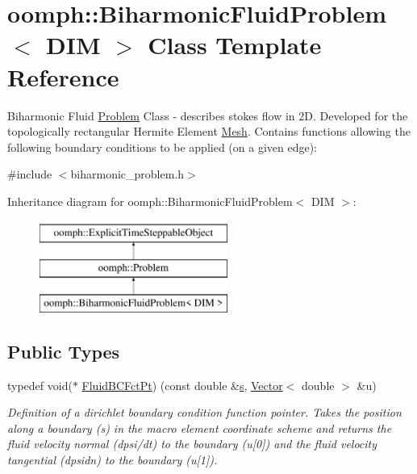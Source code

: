 \hypertarget{classoomph_1_1BiharmonicFluidProblem}{}\section{oomph\+:\+:Biharmonic\+Fluid\+Problem$<$ D\+IM $>$ Class Template Reference}
\label{classoomph_1_1BiharmonicFluidProblem}


Biharmonic Fluid \hyperlink{classoomph_1_1Problem}{Problem} Class -\/ describes stokes flow in 2D. Developed for the topologically rectangular Hermite Element \hyperlink{classoomph_1_1Mesh}{Mesh}. Contains functions allowing the following boundary conditions to be applied (on a given edge)\+:  




{\ttfamily \#include $<$biharmonic\+\_\+problem.\+h$>$}

Inheritance diagram for oomph\+:\+:Biharmonic\+Fluid\+Problem$<$ D\+IM $>$\+:\begin{figure}[H]
\begin{center}
\leavevmode
\includegraphics[height=3.000000cm]{classoomph_1_1BiharmonicFluidProblem}
\end{center}
\end{figure}
\subsection*{Public Types}
\begin{DoxyCompactItemize}
\item 
typedef void($\ast$ \hyperlink{classoomph_1_1BiharmonicFluidProblem_a93661d3b0c52bd82fd58496f9f853079}{Fluid\+B\+C\+Fct\+Pt}) (const double \&\hyperlink{cfortran_8h_ab7123126e4885ef647dd9c6e3807a21c}{s}, \hyperlink{classoomph_1_1Vector}{Vector}$<$ double $>$ \&u)
\begin{DoxyCompactList}\small\item\em Definition of a dirichlet boundary condition function pointer. Takes the position along a boundary (s) in the macro element coordinate scheme and returns the fluid velocity normal (dpsi/dt) to the boundary (u\mbox{[}0\mbox{]}) and the fluid velocity tangential (dpsidn) to the boundary (u\mbox{[}1\mbox{]}). \end{DoxyCompactList}\end{DoxyCompactItemize}
